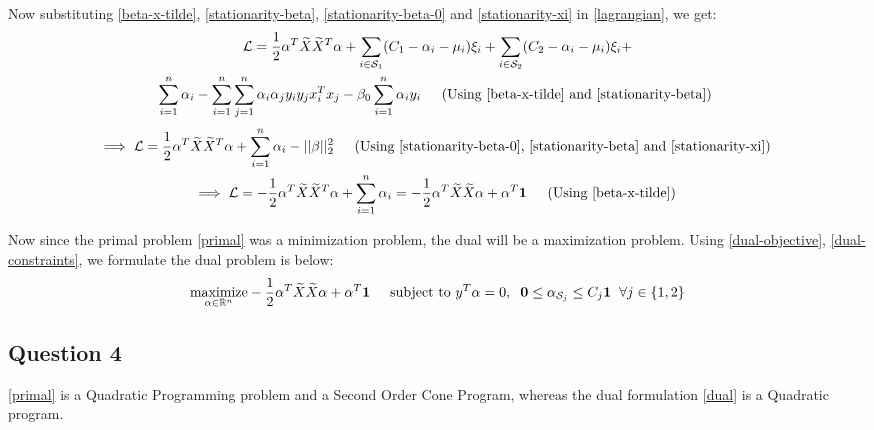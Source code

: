 \documentclass{article}
\newcommand{\xtilde}{\widetilde{X}}
\newcommand{\setS}{\mathcal{S}}
\newcommand{\real}{\mathbb{R}}
\newcommand{\lagL}{\mathcal{L}}
\newcommand{\maximize}{\mathop{\mathrm{maximize}}}
\newcommand{\maximizewrt}[1]{\underset{#1}{\maximize}}
\begin{document}
\begin{flushleft}
Now substituting \ref{beta-x-tilde}, \ref{stationarity-beta}, \ref{stationarity-beta-0} and \ref{stationarity-xi} in \ref{lagrangian}, we get:
\begin{multline}
\displaystyle \lagL = \frac{1}{2}\alpha^{T}\xtilde\xtilde^{T}\alpha + \sum_{i\in\setS_{1}} (C_{1} - \alpha_{i} - \mu_{i})\xi_{i} + \sum_{i\in\setS_{2}} (C_{2} - \alpha_{i} - \mu_{i})\xi_{i} + \\\sum_{i=1}^{n} \alpha_{i} - \sum_{i=1}^{n}\sum_{j=1}^{n}\alpha_{i}\alpha_{j} y_{i}y_{j} x_{i}^{T}x_{j} - \beta_{0}\sum_{i=1}^{n}\alpha_{i}y_{i} \hspace{4mm} \text{ (Using \ref{beta-x-tilde} and \ref{stationarity-beta}) }
\end{multline}
\begin{gather}
\displaystyle \implies \lagL = \frac{1}{2}\alpha^{T}\xtilde\xtilde^{T}\alpha + \sum_{i=1}^{n} \alpha_{i} - ||\beta||_{2}^{2} \hspace{4mm} \text{ (Using \ref{stationarity-beta-0}, \ref{stationarity-beta} and \ref{stationarity-xi}) } \\
\label{dual-objective}
\displaystyle \implies \lagL = -\frac{1}{2}\alpha^{T}\xtilde\xtilde^{T}\alpha + \sum_{i=1}^{n} \alpha_{i} = -\frac{1}{2}\alpha^{T}\xtilde\xtilde\alpha + \alpha^{T}\mathbf{1} \hspace{4mm} \text{ (Using \ref{beta-x-tilde}) }
\end{gather}

Now since the primal problem \ref{primal} was a minimization problem, the dual will be a maximization problem. Using \ref{dual-objective}, \ref{dual-constraints}, we formulate the dual problem is below:
\begin{equation}
\label{dual}
\maximizewrt{\alpha \in \real^{n}} -\frac{1}{2}\alpha^{T}\xtilde\xtilde\alpha + \alpha^{T}\mathbf{1} \hspace{5mm}
\text{subject to } y^{T}\alpha = 0, \hspace{2mm} \mathbf{0} \leq \alpha_{\setS_{j}} \leq C_{j}\mathbf{1} \hspace{2mm} \forall j \in \{1, 2\}
\end{equation}
\end{flushleft}

\subsection*{Question 4}
\ref{primal} is a Quadratic Programming problem and a Second Order Cone Program, whereas the dual formulation \ref{dual} is a Quadratic program.
\end{document}
